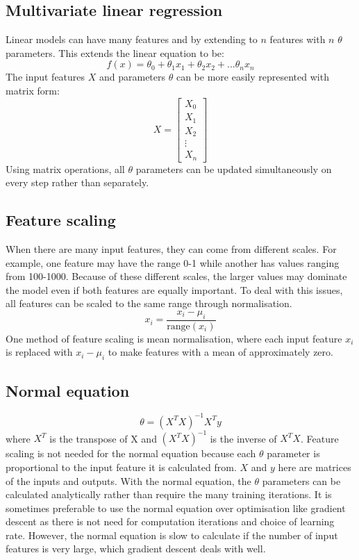 \documentclass[CS5104-Notes.tex]{subfiles}
\begin{document}
\subsection{Multivariate linear regression}
Linear models can have many features and by extending to $n$ features with $n$ $\theta$ parameters. This extends the linear equation to be:
\begin{equation}
f(x) = \theta_{0} + \theta_{1}x_{1} + \theta_{2}x_{2} + ... \theta_{n}x_{n}
\end{equation}
The input features $X$ and parameters $\theta$ can be more easily represented with matrix form:
\begin{equation}
X = \begin{bmatrix}
X_{0} \\
X_{1} \\
X_{2} \\
\vdots \\
X_{n}
\end{bmatrix}
\end{equation}
Using matrix operations, all $\theta$ parameters can be updated simultaneously on every step rather than separately.

\subsection{Feature scaling}
When there are many input features, they can come from different scales. For example, one feature may have the range 0-1 while another has values ranging from 100-1000. Because of these different scales, the larger values may dominate the model even if both features are equally important. To deal with this issues, all features can be scaled to the same range through normalisation.
\begin{equation}
x_{i} = \frac{x_{i} - \mu_{i}}{\text{range}(x_{i})}
\end{equation}
One method of feature scaling is mean normalisation, where each input feature $x_{i}$ is replaced with $x_{i} - \mu_{i}$ to make features with a mean of approximately zero. 

\subsection{Normal equation}
\begin{equation}
\theta = (X^{T}X)^{-1}X^{T}y
\end{equation}
where $X^{T}$ is the transpose of X and $(X^{T}X)^{-1}$ is the inverse of $X^{T}X$. Feature scaling is not needed for the normal equation because each $\theta$ parameter is proportional to the input feature it is calculated from. $X$ and $y$ here are matrices of the inputs and outputs. With the normal equation, the $\theta$ parameters can be calculated analytically rather than require the many training iterations. It is sometimes preferable to use the normal equation over optimisation like gradient descent as there is not need for computation iterations and choice of learning rate. However, the normal equation is slow to calculate if the number of input features is very large, which gradient descent deals with well. 
\end{document}
